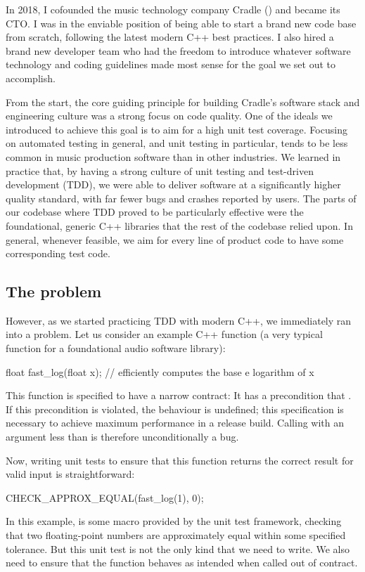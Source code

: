 In 2018, I cofounded the music technology company Cradle (\hyperref[https://cradle.app]{}) and became its CTO. I was in the enviable position of being able to start a brand new code base from scratch, following the latest modern C++ best practices. I also hired a brand new developer team who had the freedom to introduce whatever software technology and coding guidelines made most sense for the goal we set out to accomplish.

From the start, the core guiding principle for building Cradle's software stack and engineering culture was a strong focus on code quality. One of the ideals we introduced to achieve this goal is to aim for a high unit test coverage. Focusing on automated testing in general, and unit testing in particular, tends to be less common in  music production software than in other industries. We learned in practice that, by having a strong culture of unit testing and test-driven development (TDD), we were able to deliver software at a significantly higher quality standard, with far fewer bugs and crashes reported by users. The parts of our codebase where TDD proved to be particularly effective were the foundational, generic C++ libraries that the rest of the codebase relied upon. In general, whenever feasible, we aim for every line of product code to have some corresponding test code.

\subsection{The problem}

However, as we started practicing TDD with modern C++, we immediately ran into a problem. Let us consider an example C++ function (a very typical function for a foundational audio software library):
\begin{codeblock}
float fast_log(float x);  // efficiently computes the base e logarithm of x
\end{codeblock}

This function is specified to have a narrow contract: It has a precondition that . If this precondition is violated, the behaviour is undefined; this specification is necessary to achieve maximum performance in a release build. Calling  with an argument less than  is therefore unconditionally a bug.

Now, writing unit tests to ensure that this function returns the correct result for valid input is straightforward:
\begin{codeblock}
CHECK_APPROX_EQUAL(fast_log(1), 0);
\end{codeblock}
In this example,  is some macro provided by the unit test framework, checking that two floating-point numbers are approximately equal within some specified tolerance. But this unit test is not the only kind that we need to write. We also need to ensure that the function behaves as intended when called out of contract.

